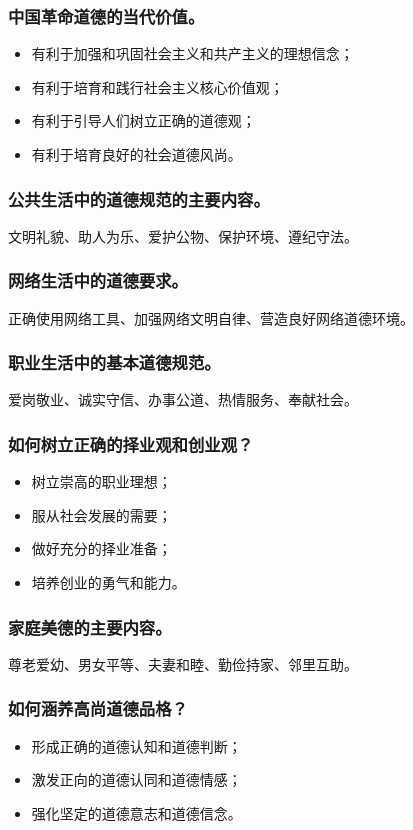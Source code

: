 \documentclass{article}
\begin{document}
\subsubsection{中国革命道德的当代价值。}
\begin{itemize}
    \item 有利于加强和巩固社会主义和共产主义的理想信念；
    \item 有利于培育和践行社会主义核心价值观；
    \item 有利于引导人们树立正确的道德观；
    \item 有利于培育良好的社会道德风尚。
\end{itemize}

\subsubsection{公共生活中的道德规范的主要内容。}
文明礼貌、助人为乐、爱护公物、保护环境、遵纪守法。

\subsubsection{网络生活中的道德要求。}
正确使用网络工具、加强网络文明自律、营造良好网络道德环境。

\subsubsection{职业生活中的基本道德规范。}
爱岗敬业、诚实守信、办事公道、热情服务、奉献社会。

\subsubsection{如何树立正确的择业观和创业观？}
\begin{itemize}
    \item 树立崇高的职业理想；
    \item 服从社会发展的需要；
    \item 做好充分的择业准备；
    \item 培养创业的勇气和能力。
\end{itemize}

\subsubsection{家庭美德的主要内容。}
尊老爱幼、男女平等、夫妻和睦、勤俭持家、邻里互助。

\subsubsection{如何涵养高尚道德品格？}
\begin{itemize}
    \item 形成正确的道德认知和道德判断；
    \item 激发正向的道德认同和道德情感；
    \item 强化坚定的道德意志和道德信念。
\end{itemize}
\end{document}
